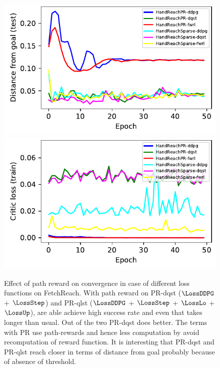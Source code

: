\begin{figure}
  \includegraphics[width=\frac\columnwidth]{./media/res/d5cefef-path_reward-HandReachPR-v0-dqst/test/ag_g_dist.pdf}%
  \includegraphics[width=\frac\columnwidth]{./media/res/d5cefef-path_reward-HandReachPR-v0-dqst/train/critic_loss.pdf}\\
  \label{fig:path-reward-1}%
  \caption{Effect of path reward on convergence in case of different loss
    functions on FetchReach. With path reward on PR-dqst
    ($\LossDDPG$ + $\LossStep$)
    and PR-qlst
    ($\LossDDPG$ + $\LossStep$ + $\LossLo$ + $\LossUp$), are able achieve high
    success rate and even that takes longer than usual. Out of the two PR-dqst
    does better. The terms with PR use path-rewards and hence less computation
    by avoid recomputation of reward function. It is interesting that PR-dqst
    and PR-qlst reach closer in terms of distance from goal probably because of
    absence of threshold.}%
\end{figure}%
% 

